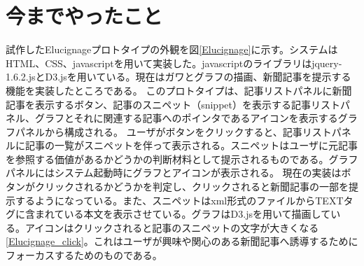 \documentclass{matsushita-zemi}
\begin{document}
\section{今までやったこと}

試作したElucignageプロトタイプの外観を図\ref{Elucignage}に示す。システムはHTML、CSS、javascriptを用いて実装した。javascriptのライブラリはjquery-1.6.2.jsとD3.jsを用いている。現在はガワとグラフの描画、新聞記事を提示する機能を実装したところである。
このプロトタイプは、記事リストパネルに新聞記事を表示するボタン、記事のスニペット（snippet）を表示する記事リストパネル、グラフとそれに関連する記事へのポインタであるアイコンを表示するグラフパネルから構成される。
ユーザがボタンをクリックすると、記事リストパネルに記事の一覧がスニペットを伴って表示される。スニペットはユーザに元記事を参照する価値があるかどうかの判断材料として提示されるものである。グラフパネルにはシステム起動時にグラフとアイコンが表示される。
現在の実装はボタンがクリックされるかどうかを判定し、クリックされると新聞記事の一部を提示するようになっている。また、スニペットはxml形式のファイルからTEXTタグに含まれている本文を表示させている。グラフはD3.jsを用いて描画している。アイコンはクリックされると記事のスニペットの文字が大きくなる\ref{Elucignage_click}。これはユーザが興味や関心のある新聞記事へ誘導するためにフォーカスするためのものである。
\end{document}

